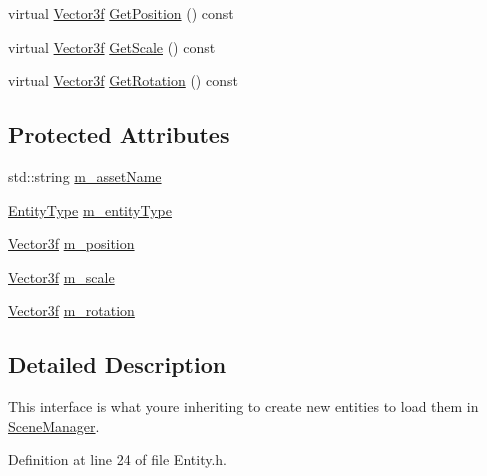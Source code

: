 \begin{DoxyCompactItemize}
\item 
virtual \mbox{\hyperlink{namespacese_a12e07512d95e2fdebdaf74a5ea2cf5f6}{Vector3f}} \mbox{\hyperlink{classse_1_1_entity_a40f94e236b724c4e375ee51f923de475}{Get\+Position}} () const
\item 
virtual \mbox{\hyperlink{namespacese_a12e07512d95e2fdebdaf74a5ea2cf5f6}{Vector3f}} \mbox{\hyperlink{classse_1_1_entity_abf885a240dc78562a82191fad6c9fc9b}{Get\+Scale}} () const
\item 
virtual \mbox{\hyperlink{namespacese_a12e07512d95e2fdebdaf74a5ea2cf5f6}{Vector3f}} \mbox{\hyperlink{classse_1_1_entity_af509daf6cdb9bd75f2c503863c9a258c}{Get\+Rotation}} () const
\end{DoxyCompactItemize}
\subsection*{Protected Attributes}
\begin{DoxyCompactItemize}
\item 
std\+::string \mbox{\hyperlink{classse_1_1_entity_aba1f7cc3700caee65b20c423185ab7ca}{m\+\_\+asset\+Name}}
\item 
\mbox{\hyperlink{namespacese_ae73a909a94998bc95235eb9b16e405f1}{Entity\+Type}} \mbox{\hyperlink{classse_1_1_entity_ac5d4a145ef27824a21ea1a4cb7a63e6c}{m\+\_\+entity\+Type}}
\item 
\mbox{\hyperlink{namespacese_a12e07512d95e2fdebdaf74a5ea2cf5f6}{Vector3f}} \mbox{\hyperlink{classse_1_1_entity_ad59d1f9af185f480cd028db43d4ad0f2}{m\+\_\+position}}
\item 
\mbox{\hyperlink{namespacese_a12e07512d95e2fdebdaf74a5ea2cf5f6}{Vector3f}} \mbox{\hyperlink{classse_1_1_entity_a9c2c8636093982abc56960b947958b34}{m\+\_\+scale}}
\item 
\mbox{\hyperlink{namespacese_a12e07512d95e2fdebdaf74a5ea2cf5f6}{Vector3f}} \mbox{\hyperlink{classse_1_1_entity_ad1cfc08dd4df9fe2a2633a6c2cd3e402}{m\+\_\+rotation}}
\end{DoxyCompactItemize}


\subsection{Detailed Description}
This interface is what you\textquotesingle{}re inheriting to create new entities to load them in \mbox{\hyperlink{classse_1_1_scene_manager}{Scene\+Manager}}. 

Definition at line 24 of file Entity.\+h.



